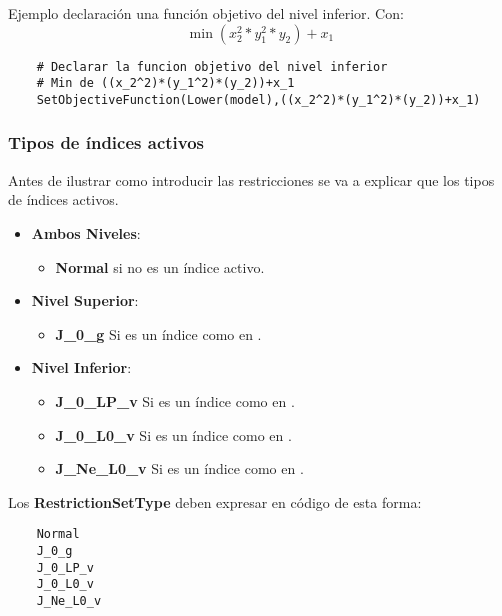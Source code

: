 Ejemplo declaración una función objetivo del nivel inferior.
Con: $$\min (x_2^2*y_1^2*y_2)+x_1$$
\begin{lstlisting}
    # Declarar la funcion objetivo del nivel inferior
    # Min de ((x_2^2)*(y_1^2)*(y_2))+x_1
    SetObjectiveFunction(Lower(model),((x_2^2)*(y_1^2)*(y_2))+x_1)
\end{lstlisting}

\subsubsection{Tipos de índices activos}
\begin{samepage}
Antes de ilustrar como introducir las restricciones se va a explicar 
que los tipos de índices activos.

\begin{itemize}
    \item \textbf{Ambos Niveles}:
        \begin{itemize}
            \item \textbf{Normal} si no es un índice activo.
        \end{itemize}
    \item \textbf{Nivel Superior}:
     \begin{itemize}
        \item \textbf{J\_0\_g} Si es un índice como en .
     \end{itemize}
    \item \textbf{Nivel Inferior}:
    \begin{itemize}
        \item \textbf{J\_0\_LP\_v} Si es un índice como en .
        \item  \textbf{J\_0\_L0\_v} Si es un índice como en .
        \item  \textbf{J\_Ne\_L0\_v} Si es un índice como en .
    \end{itemize}
\end{itemize}
\end{samepage}

Los \textbf{RestrictionSetType} deben expresar en código de esta forma:
\begin{lstlisting}
    Normal 
    J_0_g 
    J_0_LP_v
    J_0_L0_v
    J_Ne_L0_v
\end{lstlisting}

